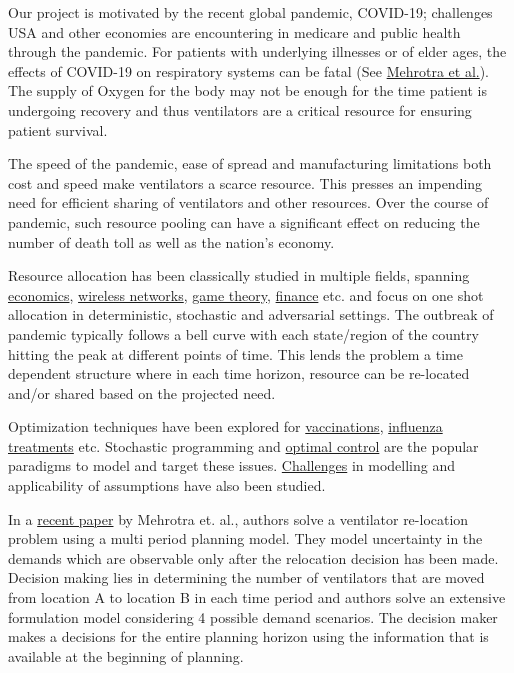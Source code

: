 \documentclass[11pt,letterpaper]{article}
\begin{document}
Our project is motivated by the recent global pandemic, COVID-19; challenges USA and other economies are encountering in medicare and public health through the pandemic. For patients with underlying illnesses or of elder ages, the effects of COVID-19 on respiratory systems can be fatal (See \href{http://www.optimization-online.org/DB_FILE/2020/04/7719.pdf}{Mehrotra et al.}). The supply of Oxygen for the body may not be enough for the time patient is undergoing recovery and thus ventilators are a critical resource for ensuring patient survival. 

The speed of the pandemic, ease of spread and manufacturing limitations both cost and speed make ventilators a scarce resource. This presses an impending need for efficient sharing of ventilators and other resources. Over the course of pandemic, such resource pooling can have a significant effect on reducing the number of death toll as well as the nation's economy.  

Resource allocation has been classically studied in multiple fields, spanning
\href{https://eprints.illc.uva.nl/168/}{economics},
\href{https://dl.acm.org/doi/book/10.5555/1457343}{wireless networks},
\href{https://link.springer.com/chapter/10.1007/978-1-349-24002-9_5}{game theory},
\href{https://ideas.repec.org/a/eee/jrpoli/v22y1996i3p218-220.html}{finance} etc. 
and focus on one shot allocation in deterministic, stochastic and adversarial settings. 
The outbreak of pandemic typically follows a bell curve with each state/region of the country hitting the peak at different points of time. 
This lends the problem a time dependent structure where in each time horizon, resource can be re-located and/or shared based on the projected need. 

Optimization techniques have been explored for 
\href{https://www.ncbi.nlm.nih.gov/pubmed/18700149}{vaccinations},
\href{http://www2.pitt.edu/~schaefer/papers/FluShotDesign.pdf}{influenza treatments} etc. Stochastic programming and \href{https://www.sciencedirect.com/science/article/abs/pii/0025556479900828}{optimal control} are the popular paradigms to model and target these issues. \href{https://www.sciencedirect.com/science/article/pii/S1755436514000280}{Challenges} in modelling and applicability of assumptions have also been studied. 

In a \href{https://pubsonline.informs.org/doi/pdf/10.1287/trsc.2017.0777}{recent paper} by Mehrotra et. al., authors solve a ventilator re-location problem using a multi period planning model. They model uncertainty in the demands which are observable only after the relocation decision has been made. Decision making lies in determining the number of ventilators that are moved from location A to location B in each time period and authors solve an extensive formulation model considering 4 possible demand scenarios. The decision maker makes a decisions for the entire planning horizon using the information that is available at the beginning of planning. 
\end{document}

